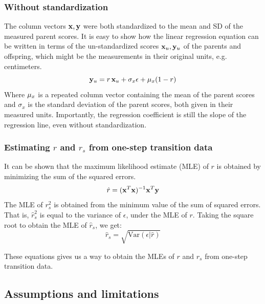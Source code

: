 \documentclass[letterpaper,10pt]{article} %
\begin{document}
\subsubsection*{Without standardization}
The column vectors $\bold{x}, \bold{y}$ were both standardized to the mean and SD of the measured parent scores. It is easy to show how the linear regression equation can be written in terms of the un-standardized scores $\bold{x}_u, \bold{y}_u$ of the parents and offspring, which might be the measurements in their original units, e.g. centimeters. 
$$\bold{y}_u =  r \, \bold{x}_u + \sigma_x\bold{\epsilon} +  \bold{\mu}_x(1-r)$$
Where $\bold{\mu}_x$ is a repeated column vector containing the mean of the parent scores and $\sigma_x$ is the standard deviation of the parent scores, both given in their measured units. Importantly, the regression coefficient is still the slope of the regression line, even without standardization. 


\subsubsection*{Estimating $r$ and $r_s$ from one-step transition data}
It can be shown that the maximum likelihood estimate (MLE) of $r$ is obtained by minimizing the sum of the squared errors. 
%
$$\hat{r} = (\bold{x}^T \bold{x})^{-1} \bold{x}^T \bold{y}$$
%
The MLE of $r_s^2$ is obtained from the minimum value of the sum of squared errors. That is, $\hat{r}_s^2$ is equal to the variance of $\epsilon$, under the MLE of $r$. Taking the square root to obtain the MLE of $\hat{r}_s$, we get:
%
$$\hat{r}_s = \sqrt{\mathrm{Var}({\epsilon} | \hat{r})}$$%

These equations gives us a way to obtain the MLEs of $r$ and $r_s$ from one-step transition data. 



\subsection{Assumptions and limitations}
\end{document}

